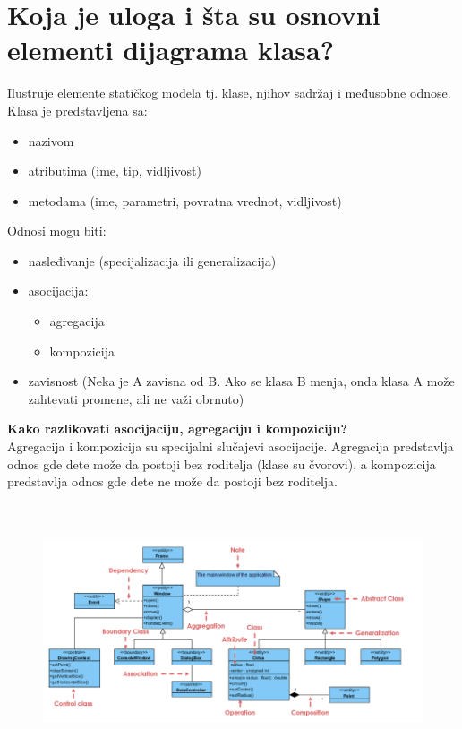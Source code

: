 \documentclass[a4paper]{article}
\begin{document}
\section{Koja je uloga i šta su osnovni elementi dijagrama klasa?}
  Ilustruje elemente statičkog modela tj. klase, njihov sadržaj i međusobne odnose.
  Klasa je predstavljena sa:
  \begin{itemize}
    \item nazivom
    \item atributima (ime, tip, vidljivost)
    \item metodama (ime, parametri, povratna vrednot, vidljivost)
  \end{itemize}
  Odnosi mogu biti:
  \begin{itemize}
    \item nasleđivanje (specijalizacija ili generalizacija)
    \item asocijacija:
          \begin{itemize}
            \item agregacija
            \item kompozicija
          \end{itemize}
    \item zavisnost (Neka je A zavisna od B. Ako se klasa B menja, onda klasa A može zahtevati promene,
          ali ne važi obrnuto)
  \end{itemize}
  \textbf{Kako razlikovati asocijaciju, agregaciju i kompoziciju?}\\
  Agregacija i kompozicija su specijalni slučajevi asocijacije. 
  Agregacija predstavlja odnos gde dete može da postoji bez roditelja (klase su čvorovi), 
  a kompozicija predstavlja odnos gde dete ne može da postoji bez roditelja.
  \begin{figure}[H]
    \begin{center}
        \includegraphics[width=120mm,height=75mm]{Slike/uml_klase.png}
    \end{center}
  \end{figure} 
\end{document}
